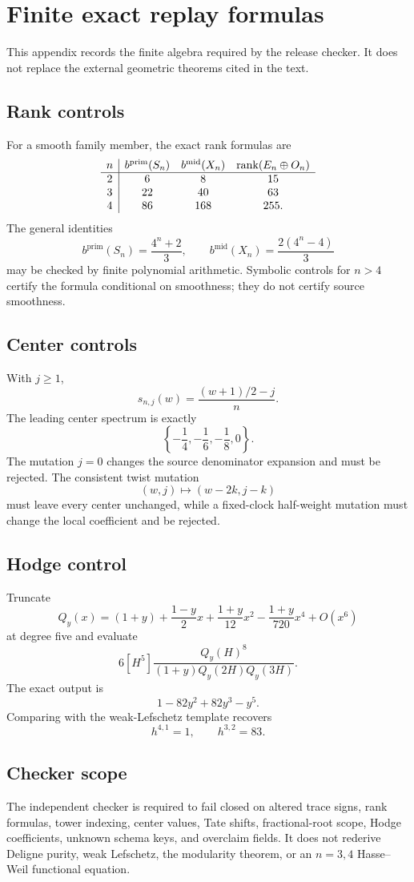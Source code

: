 \section{Finite exact replay formulas}\label{app:replays}

This appendix records the finite algebra required by the release checker.
It does not replace the external geometric theorems cited in the text.

\subsection{Rank controls}

For a smooth family member, the exact rank formulas are
\[
\begin{array}{c|ccc}
n&b^{\mathrm{prim}}(S_n)&b^{\mathrm{mid}}(X_n)&
\operatorname{rank}(E_n\oplus O_n)\\ \hline
2&6&8&15\\
3&22&40&63\\
4&86&168&255.
\end{array}
\]
The general identities
\[
 b^{\mathrm{prim}}(S_n)=\frac{4^n+2}{3},\qquad
 b^{\mathrm{mid}}(X_n)=\frac{2(4^n-4)}{3}
\]
may be checked by finite polynomial arithmetic.  Symbolic controls for
\(n>4\) certify the formula conditional on smoothness; they do not certify
source smoothness.

\subsection{Center controls}

With \(j\ge1\),
\[
 s_{n,j}(w)=\frac{(w+1)/2-j}{n}.
\]
The leading center spectrum is exactly
\[
 \left\{-\frac14,-\frac16,-\frac18,0\right\}.
\]
The mutation \(j=0\) changes the source denominator expansion and must be
rejected.  The consistent twist mutation
\[
 (w,j)\mapsto(w-2k,j-k)
\]
must leave every center unchanged, while a fixed-clock half-weight mutation
must change the local coefficient and be rejected.

\subsection{Hodge control}

Truncate
\[
 Q_y(x)=(1+y)+\frac{1-y}{2}x+\frac{1+y}{12}x^2
 -\frac{1+y}{720}x^4+O(x^6)
\]
at degree five and evaluate
\[
 6[H^5]\frac{Q_y(H)^8}{(1+y)Q_y(2H)Q_y(3H)}.
\]
The exact output is
\[
 1-82y^2+82y^3-y^5.
\]
Comparing with the weak-Lefschetz template recovers
\[
 h^{4,1}=1,\qquad h^{3,2}=83.
\]

\subsection{Checker scope}

The independent checker is required to fail closed on altered trace signs,
rank formulas, tower indexing, center values, Tate shifts, fractional-root
scope, Hodge coefficients, unknown schema keys, and overclaim fields.
It does not rederive Deligne purity, weak Lefschetz, the modularity theorem,
or an \(n=3,4\) Hasse--Weil functional equation.
